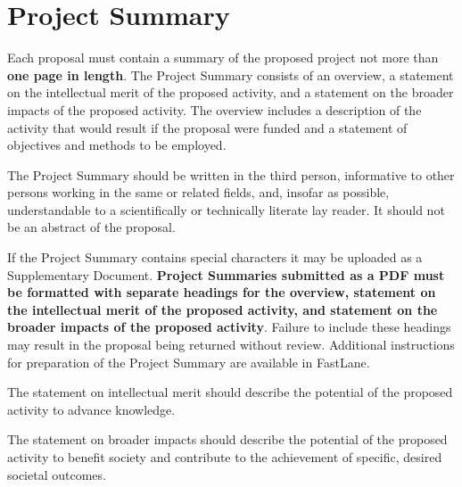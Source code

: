 \section{Project Summary}
Each proposal must contain a summary of the proposed project not more than {\bf one page in length}. The Project
Summary consists of an overview, a statement on the intellectual merit of the proposed activity, and a statement
on the broader impacts of the proposed activity.
The overview includes a description of the activity that would result if the proposal were funded and a statement
of objectives and methods to be employed.

The Project Summary should be written in the third person, informative to other persons working in
the same or related fields, and, insofar as possible, understandable to a scientifically or technically
literate lay reader. It should not be an abstract of the proposal.

If the Project Summary contains special characters it may be uploaded as a Supplementary Document.
{\bf Project Summaries submitted as a PDF must be formatted with separate headings for the overview, statement on the
intellectual merit of the proposed activity, and statement on the broader impacts of the proposed activity}. Failure
to include these headings may result in the proposal being returned without review.
Additional instructions for preparation of the Project Summary are available in FastLane.

The statement on intellectual merit should describe the potential of the proposed activity to advance knowledge.

The statement on broader impacts should describe the potential of the proposed activity to benefit society and contribute to the achievement of specific, desired societal outcomes.
